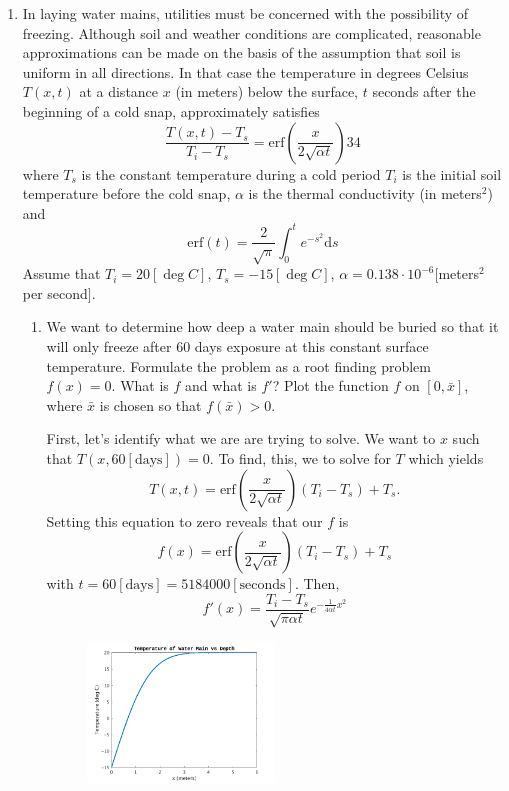 \documentclass[a4paper,12pt]{article}
\newcommand{\erf}{\mathrm{erf}}
\newcommand{\dd}{\mathrm{d}}
\begin{document}
\begin{enumerate}[label = \arabic*.]
		\item In laying water mains, utilities must be concerned with the possibility of freezing. Although soil and weather conditions are complicated, reasonable approximations can be made on the basis of the assumption that soil is uniform in all directions.  In that case the temperature in degrees Celsius $ T(x,t) $ at a distance $ x $ (in meters) below the surface, $ t $ seconds after the beginning of a cold snap, approximately satisfies
		\[
			\frac{T(x,t) - T_s}{T_i - T_s} = \erf\left(\frac{x}{2\sqrt{\alpha t}}\right)34
		\]
		where $ T_s $ is the constant temperature during a cold period $ T_i $ is the initial soil temperature before the cold snap, $ \alpha $ is the thermal conductivity (in meters$ ^2 $) and 
		\[
			\erf(t) = \frac{2}{\sqrt{\pi}} \int_0^t e^{-s^2}\dd s
		\]
		Assume that $ T_i = 20 [\deg C]$, $ T_s = -15 [\deg C] $, $ \alpha = 0.138 \cdot 10^{-6} [$meters$ ^2 $ per second$ ] .$
        \begin{enumerate}[label = \roman*.]
            \item We want to determine how deep a water main should be buried so that it will only freeze after 60 days exposure at this constant surface temperature. Formulate the problem as a root finding problem $ f(x) = 0. $ What is $ f $ and what is $ f' $? Plot the function $ f $ on $ [0, \bar{x}] $, where $ \bar{x} $ is chosen so that $ f(\bar{x}) > 0 $. 
            
            First, let's identify what we are are trying to solve. We want to $ x $ such that $ T(x, 60 [\text{days}]) = 0 $. To find, this, we to solve for $ T $ which yields
            \[
                T(x,t) = \erf\left(\frac{x}{2\sqrt{\alpha t}}\right) (T_i - T_s) + T_s.
            \]
            Setting this equation to zero reveals that our $ f $ is 
            \[
                f(x) = \erf\left(\frac{x}{2\sqrt{\alpha t}}\right) (T_i - T_s) + T_s
            \]
            with $ t = 60 [\text{days}] = 5184000 [\text{seconds}] $. Then,
            \[
                f'(x) = \frac{T_i - T_s}{\sqrt{\pi \alpha t}} e^{-\frac{1}{4 \alpha t} x^2}
            \]
            \begin{figure}[h!]
                \centering
                \includegraphics[width = 0.5\textwidth]{"images/WaterTemp.png"}
            \end{figure}
        

\end{enumerate}
\end{enumerate}
\end{document}
